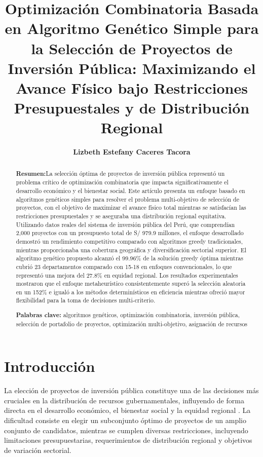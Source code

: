 \documentclass[12pt,a4paper]{article}
\begin{document}
\title{\textbf{Optimización Combinatoria Basada en Algoritmo Genético Simple para la Selección de Proyectos de Inversión Pública: Maximizando el Avance Físico bajo Restricciones Presupuestales y de Distribución Regional}}

\author{
\textbf{Lizbeth Estefany Caceres Tacora}
}

\maketitle

\begin{abstract}
\noindent \textbf{Resumen:}La selección óptima de proyectos de inversión pública representó un problema crítico de optimización combinatoria que impacta significativamente el desarrollo económico y el bienestar social. Este artículo presenta un enfoque basado en algoritmos genéticos simples para resolver el problema multi-objetivo de selección de proyectos, con el objetivo de maximizar el avance físico total mientras se satisfacían las restricciones presupuestales y se aseguraba una distribución regional equitativa. Utilizando datos reales del sistema de inversión pública del Perú, que comprendían 2,000 proyectos con un presupuesto total de S/ 979.9 millones, el enfoque desarrollado demostró un rendimiento competitivo comparado con algoritmos greedy tradicionales, mientras proporcionaba una cobertura geográfica y diversificación sectorial superior. El algoritmo genético propuesto alcanzó el 99.96\% de la solución greedy óptima mientras cubrió 23 departamentos comparado con 15-18 en enfoques convencionales, lo que representó una mejora del 27.8\% en equidad regional. Los resultados experimentales mostraron que el enfoque metaheurístico consistentemente superó la selección aleatoria en un 152\% e igualó a los métodos determinísticos en eficiencia mientras ofreció mayor flexibilidad para la toma de decisiones multi-criterio.

\vspace{0.5cm}
\noindent \textbf{Palabras clave:} algoritmos genéticos, optimización combinatoria, inversión pública, selección de portafolio de proyectos, optimización multi-objetivo, asignación de recursos
\end{abstract}

\section{Introducción}

La elección de proyectos de inversión pública constituye una de las decisiones más cruciales en la distribución de recursos gubernamentales, influyendo de forma directa en el desarrollo económico, el bienestar social y la equidad regional \cite{martinez2021}. La dificultad consiste en elegir un subconjunto óptimo de proyectos de un amplio conjunto de candidatos, mientras se cumplen diversas restricciones, incluyendo limitaciones presupuestarias, requerimientos de distribución regional y objetivos de variación sectorial.
\end{document}
